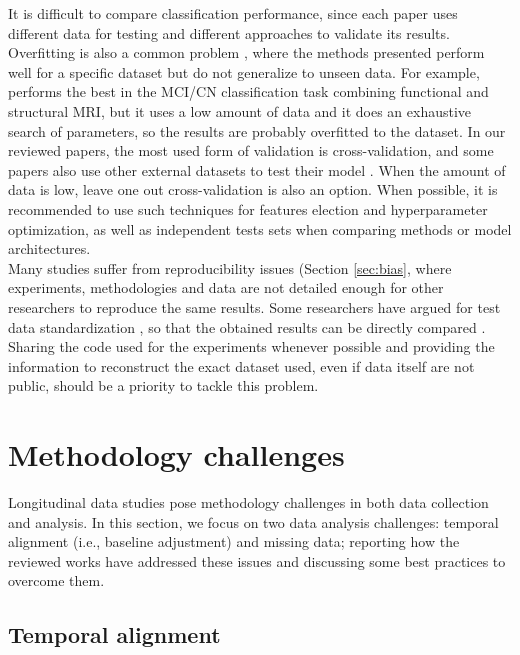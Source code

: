 It is difficult to compare classification performance, since each paper uses different data for testing and different approaches to validate its results. Overfitting is also a common problem \cite{cuingnet,Mendelson2017}, where the methods presented perform well for a specific dataset but do not generalize to unseen data. For example, \cite{Yang2018} performs the best in the MCI/CN classification task combining functional and structural MRI, but it uses a low amount of data and it does an exhaustive search of parameters, so the results are probably overfitted to the dataset. In our reviewed papers, the most used form of validation is cross-validation, and some papers also use other external datasets to test their model \cite{Aksman2016,Platero2019}. When the amount of data is low, leave one out cross-validation is also an option. When possible, it is recommended to use such techniques for features election and hyperparameter optimization, as well as independent tests sets when comparing methods or model architectures. \\

Many studies suffer from reproducibility issues (Section \ref{sec:bias}, where experiments, methodologies and data are not detailed enough for other researchers to reproduce the same results. Some researchers have argued for test data standardization \cite{cuingnet,Samper-Gonzalez2018,Wyman2013}, so that the obtained results can be directly compared \cite{Minhas2016,Minhas2018,Sanroma2017}. Sharing the code used for the experiments whenever possible and providing the information to reconstruct the exact dataset used, even if data itself are not public, should be a priority to tackle this problem. \\

\section{Methodology challenges}
\label{sec:missing}

Longitudinal data studies pose methodology challenges in both data collection and analysis. In this section, we focus on two data analysis challenges: temporal alignment (i.e., baseline adjustment) and missing data; reporting how the reviewed works have addressed these issues and discussing some best practices to overcome them.

\subsection{Temporal alignment}
\label{subsec:tempalig}

